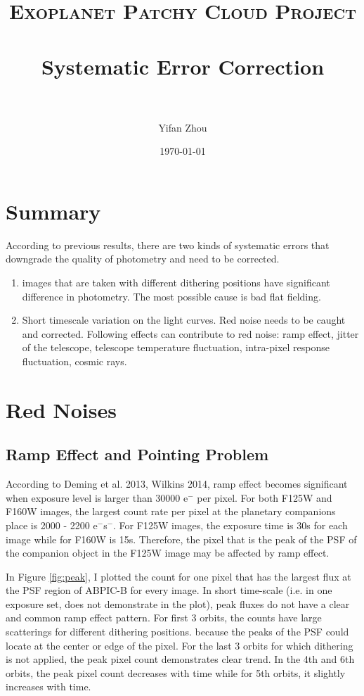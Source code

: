 \documentclass[paper=letter, fontsize=11pt]{scrartcl} %
\title{ 
\normalfont \normalsize 
\textsc{Exoplanet Patchy Cloud Project} \\ [25pt] %
\horrule{0.5pt} \\[0.4cm] %
\huge Systematic Error Correction\\ %
\horrule{2pt} \\[0.5cm] %
}
\author{Yifan Zhou} %
\date{\normalsize\today} %
\numberwithin{equation}{section} %
\numberwithin{figure}{section} %
\numberwithin{table}{section} %
\begin{document}
\maketitle %
\section{Summary}

According to previous results, there are two kinds of systematic errors
that downgrade the quality of photometry and need to be corrected.
\begin{enumerate}
\item images that are taken with different dithering positions have
  significant difference in photometry. The most possible cause is 
  bad flat fielding.
\item Short timescale variation on the light curves. Red noise needs
  to be caught and corrected. Following effects can contribute to red
  noise:
  ramp effect, jitter of the telescope, telescope temperature
  fluctuation, intra-pixel  response fluctuation, cosmic rays.
\end{enumerate}

  \section{Red Noises}
  \subsection{Ramp Effect and Pointing Problem}
  According to Deming et al. 2013, Wilkins 2014, ramp effect becomes significant
  when exposure level is larger than 30000 e$^{-}$ per pixel. For both
  F125W and F160W images, the largest count rate per pixel at the
  planetary companions place is 2000 - 2200 e$^{-}$s$^{-}$. For F125W
  images, the exposure time is 30s for each image while for F160W is
  15s. Therefore, the pixel that is the peak of the PSF of the
  companion object in the F125W image may be affected by ramp effect.

  In Figure \ref{fig:peak}, I plotted the count for one pixel that has
  the largest flux at the PSF region of ABPIC-B for every image. In short time-scale
  (i.e. in one exposure set, does not demonstrate in the plot), peak
  fluxes do not have a clear and common ramp effect pattern. For first
  3 orbits, the counts have large scatterings for different dithering
  positions. because the peaks of the PSF could locate at the center
  or edge of the pixel. For the last 3 orbits for which dithering is not
  applied, the peak pixel count demonstrates clear trend.  In the 4th
  and 6th orbits, the peak pixel count decreases with time while for
  5th orbits, it slightly increases with time.
\end{document}
